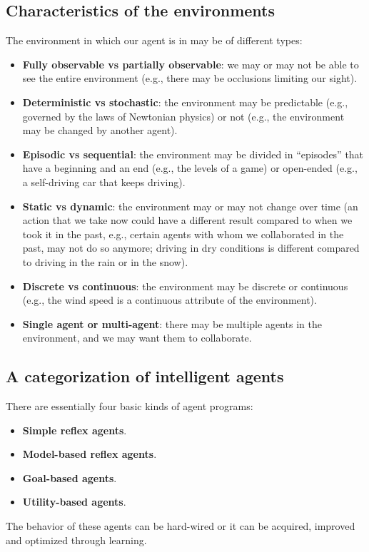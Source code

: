 \subsection{Characteristics of the environments}
The environment in which our agent is in may be of different types:
\begin{itemize}
    \item \textbf{Fully observable vs partially observable}: we may or may not be able to see the entire environment (e.g., there may be occlusions limiting our sight).
    \item \textbf{Deterministic vs stochastic}: the environment may be predictable (e.g., governed by the laws of Newtonian physics) or not (e.g., the environment may be changed by another agent).
    \item \textbf{Episodic vs sequential}: the environment may be divided in “episodes” that have a beginning and an end (e.g., the levels of a game) or open-ended (e.g., a self-driving car that keeps driving).
    \item \textbf{Static vs dynamic}: the environment may or may not change over time (an action that we take now could have a different result compared to when we took it in the past, e.g., certain agents with whom we collaborated in the past, may not do so anymore; driving in dry conditions is different compared to driving in the rain or in the snow).
    \item \textbf{Discrete vs continuous}: the environment may be discrete or continuous (e.g., the wind speed is a continuous attribute of the environment).
    \item \textbf{Single agent or multi-agent}: there may be multiple agents in the environment, and we may want them to collaborate.
\end{itemize}

\subsection{A categorization of intelligent agents}
There are essentially four basic kinds of agent programs:
\begin{itemize}
    \item \textbf{Simple reflex agents}.
    \item \textbf{Model-based reflex agents}.
    \item \textbf{Goal-based agents}.
    \item \textbf{Utility-based agents}.
\end{itemize}
The behavior of these agents can be hard-wired or it can be acquired, improved and optimized through learning.

